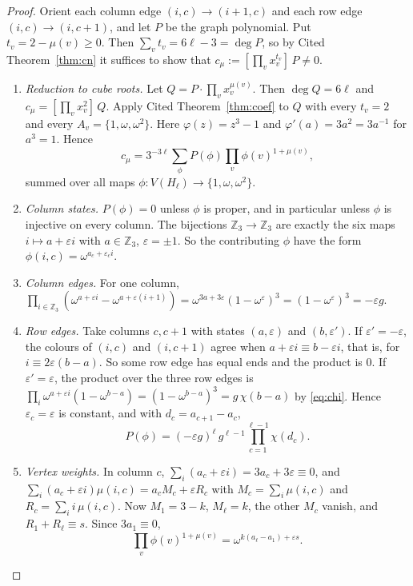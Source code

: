 \documentclass[11pt]{article}
\theoremstyle{plain}
\theoremstyle{definition}
\theoremstyle{remark}
\newcommand{\Z}{\mathbb{Z}}
\newenvironment{steps}{\begin{enumerate}[label=(\arabic*),leftmargin=2.2em,itemsep=0.35em]}{\end{enumerate}}
\begin{document}
\begin{proof}
Orient each column edge $(i, c) \to (i+1, c)$ and each row edge $(i, c) \to (i, c+1)$, and let
$P$ be the graph polynomial. Put $t_v = 2 - \mu(v) \ge 0$. Then $\sum_v t_v = 6\ell - 3 = \deg P$,
so by Cited Theorem~\ref{thm:cn} it suffices to show that
$c_\mu := [\prod_v x_v^{t_v}]\, P \ne 0$.

\begin{steps}
\item \emph{Reduction to cube roots.} Let $Q = P \cdot \prod_v x_v^{\mu(v)}$. Then
$\deg Q = 6\ell$ and $c_\mu = [\prod_v x_v^2]\, Q$. Apply Cited Theorem~\ref{thm:coef} to $Q$
with every $t_v = 2$ and every $A_v = \{1, \omega, \omega^2\}$. Here $\varphi(z) = z^3 - 1$ and
$\varphi'(a) = 3a^2 = 3a^{-1}$ for $a^3 = 1$. Hence
\[
c_\mu = 3^{-3\ell} \sum_{\phi} P(\phi) \prod_v \phi(v)^{1 + \mu(v)},
\]
summed over all maps $\phi : V(H_\ell) \to \{1, \omega, \omega^2\}$.

\item \emph{Column states.} $P(\phi) = 0$ unless $\phi$ is proper, and in particular unless
$\phi$ is injective on every column. The bijections $\Z_3 \to \Z_3$ are exactly the six maps
$i \mapsto a + \varepsilon i$ with $a \in \Z_3$, $\varepsilon = \pm 1$. So the contributing
$\phi$ have the form $\phi(i, c) = \omega^{a_c + \varepsilon_c i}$.

\item \emph{Column edges.} For one column,
$\prod_{i \in \Z_3} (\omega^{a + \varepsilon i} - \omega^{a + \varepsilon (i+1)})
= \omega^{3a + 3\varepsilon}(1 - \omega^\varepsilon)^3 = (1 - \omega^{\varepsilon})^3
= -\varepsilon g$.

\item \emph{Row edges.} Take columns $c, c+1$ with states $(a, \varepsilon)$ and
$(b, \varepsilon')$. If $\varepsilon' = -\varepsilon$, the colours of $(i, c)$ and $(i, c+1)$
agree when $a + \varepsilon i \equiv b - \varepsilon i$, that is, for $i \equiv 2\varepsilon (b -
a)$. So some row edge has equal ends and the product is $0$. If $\varepsilon' = \varepsilon$,
the product over the three row edges is
$\prod_i \omega^{a + \varepsilon i}(1 - \omega^{b - a}) = (1 - \omega^{b-a})^3
= g\,\chi(b - a)$ by \eqref{eq:chi}. Hence $\varepsilon_c = \varepsilon$ is constant, and with
$d_c = a_{c+1} - a_c$,
\[
P(\phi) = (-\varepsilon g)^{\ell} \, g^{\ell - 1} \prod_{c=1}^{\ell - 1} \chi(d_c).
\]

\item \emph{Vertex weights.} In column $c$, $\sum_i (a_c + \varepsilon i) = 3a_c + 3\varepsilon
\equiv 0$, and $\sum_i (a_c + \varepsilon i)\mu(i,c) = a_c M_c + \varepsilon R_c$ with
$M_c = \sum_i \mu(i,c)$ and $R_c = \sum_i i\,\mu(i,c)$. Now $M_1 = 3 - k$, $M_\ell = k$, the other
$M_c$ vanish, and $R_1 + R_\ell \equiv s$. Since $3a_1 \equiv 0$,
\[
\prod_v \phi(v)^{1 + \mu(v)} = \omega^{k (a_\ell - a_1) + \varepsilon s}.
\]


\end{steps}
\end{proof}
\end{document}
